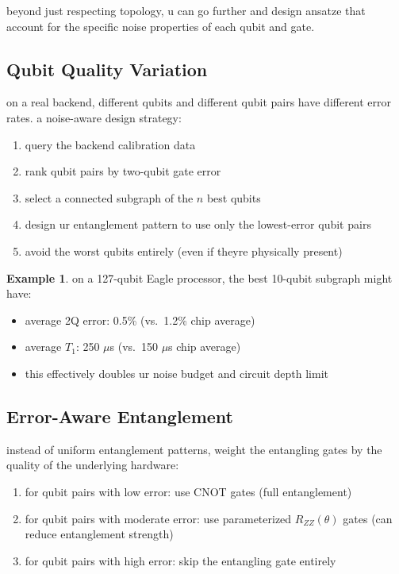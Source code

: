 \documentclass[11pt,a4paper]{article}
\theoremstyle{definition}
\newtheorem{example}{Example}[section]
\theoremstyle{remark}
\begin{document}
beyond just respecting topology, u can go further and design ansatze that account for the specific noise properties of each qubit and gate.

\subsection{Qubit Quality Variation}

on a real backend, different qubits and different qubit pairs have different error rates. a noise-aware design strategy:

\begin{enumerate}[label=\arabic*.]
    \item query the backend calibration data
    \item rank qubit pairs by two-qubit gate error
    \item select a connected subgraph of the $n$ best qubits
    \item design ur entanglement pattern to use only the lowest-error qubit pairs
    \item avoid the worst qubits entirely (even if theyre physically present)
\end{enumerate}

\begin{example}
on a 127-qubit Eagle processor, the best 10-qubit subgraph might have:
\begin{itemize}[leftmargin=*]
    \item average 2Q error: 0.5\% (vs.\ 1.2\% chip average)
    \item average $T_1$: 250 $\mu$s (vs.\ 150 $\mu$s chip average)
    \item this effectively doubles ur noise budget and circuit depth limit
\end{itemize}
\end{example}

\subsection{Error-Aware Entanglement}

instead of uniform entanglement patterns, weight the entangling gates by the quality of the underlying hardware:

\begin{enumerate}[label=\arabic*.]
    \item for qubit pairs with low error: use CNOT gates (full entanglement)
    \item for qubit pairs with moderate error: use parameterized $R_{ZZ}(\theta)$ gates (can reduce entanglement strength)
    \item for qubit pairs with high error: skip the entangling gate entirely
\end{enumerate}
\end{document}
